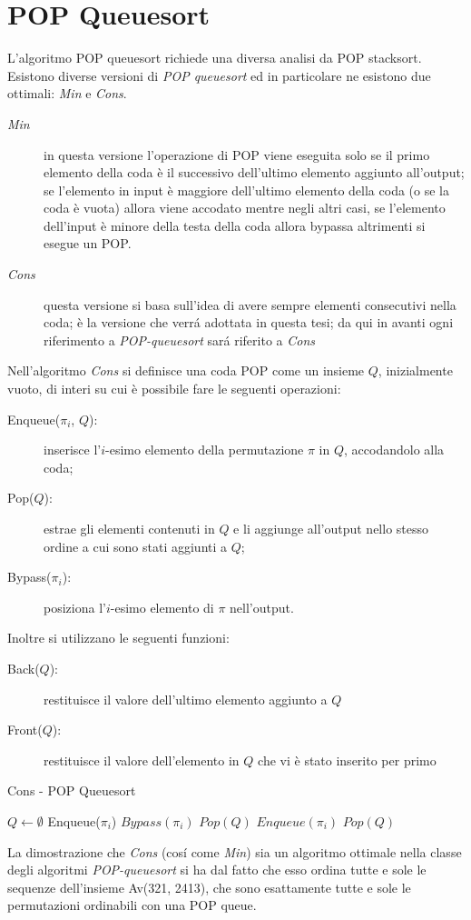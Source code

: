 \section*{POP Queuesort}L'algoritmo POP queuesort richiede una diversa analisi da POP stacksort.\\
Esistono diverse versioni di \textit{POP queuesort} ed in particolare ne esistono due ottimali\cite{cioni2021sorting}: \textit{Min} e \textit{Cons}.
\begin{description}
	\item[\textit{Min}] in questa versione l'operazione di POP viene eseguita solo se il primo elemento della coda \`e il successivo dell'ultimo elemento aggiunto all'output; se l'elemento in input \`e maggiore dell'ultimo elemento della coda (o se la coda \`e vuota) allora viene accodato mentre negli altri casi, se l'elemento dell'input \`e minore della testa della coda allora bypassa altrimenti si esegue un POP.
	\item[\textit{Cons}] questa versione si basa sull'idea di avere sempre elementi consecutivi nella coda; \`e la versione che verr\'a adottata in questa tesi; da qui in avanti ogni riferimento a \textit{POP-queuesort} sar\'a riferito a \textit{Cons}
\end{description}
Nell'algoritmo \textit{Cons} si definisce una coda POP come un insieme $Q$, inizialmente vuoto, di interi su cui \`e possibile fare le seguenti operazioni:
\begin{description}
	\item[Enqueue($\pi_i$, $Q$):] inserisce l'$i$-esimo elemento della permutazione $\pi$ in $Q$, accodandolo alla coda;
	\item[Pop($Q$):] estrae gli elementi contenuti in $Q$ e li aggiunge all'output nello stesso ordine a cui sono stati aggiunti a $Q$;
	\item[Bypass($\pi_i$):] posiziona l'$i$-esimo elemento di $\pi$ nell'output.
\end{description}
Inoltre si utilizzano le seguenti funzioni:
\begin{description}
	\item[Back($Q$):] restituisce il valore dell'ultimo elemento aggiunto a $Q$
	\item[Front($Q$):] restituisce il valore dell'elemento in $Q$ che vi \`e stato inserito per primo
\end{description}
\begin{algorithm}[H]
   \caption{Cons - POP Queuesort}
\begin{algorithmic}[1]
\State $Q\leftarrow\emptyset$ 
		\State Enqueue($\pi_i$)
	\Else
			\State $Bypass(\pi_i)$
		\Else
			\State $Pop(Q)$
			\State $Enqueue(\pi_i)$
		\EndIf
	\EndIf
\EndFor
{}
\State $Pop(Q)$
\EndIf
\end{algorithmic}
\end{algorithm}
La dimostrazione che \textit{Cons} (cos\'i come \textit{Min}) sia un algoritmo ottimale nella classe degli algoritmi \textit{POP-queuesort} si ha dal fatto che esso ordina tutte e sole le sequenze dell'insieme Av(321, 2413), che sono esattamente tutte e sole le permutazioni ordinabili con una POP queue\cite{cioni2021sorting}.

